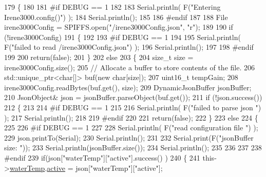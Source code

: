 \begin{DoxyCode}
179 \{
180 
181 \textcolor{preprocessor}{#if DEBUG == 1 }
182 
183     Serial.println( F(\textcolor{stringliteral}{"Entering Irene3000.config()"}) );
184     Serial.println();
185 
186 \textcolor{preprocessor}{#endif}
187 
188     File irene3000Config = SPIFFS.open(\textcolor{stringliteral}{"/irene3000Config.json"}, \textcolor{stringliteral}{"r"});
189 
190     \textcolor{keywordflow}{if} (!irene3000Config) 
191     \{
192     
193 \textcolor{preprocessor}{    #if DEBUG == 1 }
194 
195         Serial.println( F(\textcolor{stringliteral}{"failed to read /irene3000Config.json"}) );
196         Serial.println();
197     
198 \textcolor{preprocessor}{    #endif}
199 
200         \textcolor{keywordflow}{return}(\textcolor{keyword}{false});
201     \}
202     \textcolor{keywordflow}{else}
203     \{
204         \textcolor{keywordtype}{size\_t} size = irene3000Config.size();
205         \textcolor{comment}{// Allocate a buffer to store contents of the file.}
206         std::unique\_ptr<char[]> buf(\textcolor{keyword}{new} \textcolor{keywordtype}{char}[size]);
207             uint16\_t tempGain;
208         irene3000Config.readBytes(buf.get(), size);
209         DynamicJsonBuffer jsonBuffer;
210         JsonObject& json = jsonBuffer.parseObject(buf.get());
211         \textcolor{keywordflow}{if} (!json.success()) 
212         \{
213         
214 \textcolor{preprocessor}{        #if DEBUG == 1 }
215 
216             Serial.println( F(\textcolor{stringliteral}{"failed to parse json "}) );
217             Serial.println();
218         
219 \textcolor{preprocessor}{        #endif}
220             
221             \textcolor{keywordflow}{return}(\textcolor{keyword}{false});
222         \} 
223         \textcolor{keywordflow}{else}
224         \{
225         
226 \textcolor{preprocessor}{        #if DEBUG == 1 }
227     
228             Serial.println( F(\textcolor{stringliteral}{"read configuration file "}) );
229             json.printTo(Serial);
230             Serial.println();
231 
232             Serial.print(F(\textcolor{stringliteral}{"jsonBuffer size: "}));
233             Serial.println(jsonBuffer.size());
234             Serial.println();
235 
236         
237 
238 \textcolor{preprocessor}{        #endif          }
239             \textcolor{keywordflow}{if}(json[\textcolor{stringliteral}{"waterTemp"}][\textcolor{stringliteral}{"active"}].success() )
240             \{           
241                 this->\hyperlink{class_irene3000_af05612c78c758ce9db316c75ad937130}{waterTemp}.\hyperlink{struct_irene3000_1_1state_af7ff649f20b9a2fb6ca0f949ee9a25ce}{active} = json[\textcolor{stringliteral}{"waterTemp"}][\textcolor{stringliteral}{"active"}]; 

\end{DoxyCode}
